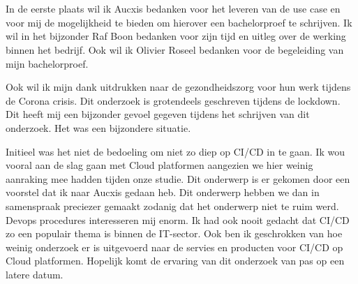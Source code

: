 
\chapter*{}
\label{ch:voorwoord}
In de eerste plaats wil ik Aucxis bedanken voor het leveren van de use case en voor mij de mogelijkheid te bieden om hierover een bachelorproef te schrijven. Ik wil in het bijzonder Raf Boon bedanken voor zijn tijd en uitleg over de werking binnen het bedrijf. Ook wil ik Olivier Roseel bedanken voor de begeleiding van mijn bachelorproef.

Ook wil ik mijn dank uitdrukken naar de gezondheidszorg voor hun werk tijdens de Corona crisis. Dit onderzoek is grotendeels geschreven tijdens de lockdown. Dit heeft mij een bijzonder gevoel gegeven tijdens het schrijven van dit onderzoek. Het was een bijzondere situatie.

Initieel was het niet de bedoeling om niet zo diep op CI/CD in te gaan. Ik wou vooral aan de slag gaan met Cloud platformen aangezien we hier weinig aanraking mee hadden tijden onze studie. Dit onderwerp is er gekomen door een voorstel dat ik naar Aucxis gedaan heb. Dit onderwerp hebben we dan in samenspraak preciezer gemaakt zodanig dat het onderwerp niet te ruim werd. Devops procedures interesseren mij enorm. Ik had ook nooit gedacht dat CI/CD zo een populair thema is binnen de IT-sector. Ook ben ik geschrokken van hoe weinig onderzoek er is uitgevoerd naar de servies en producten voor CI/CD op Cloud platformen. Hopelijk komt de ervaring van dit onderzoek van pas op een latere datum.


